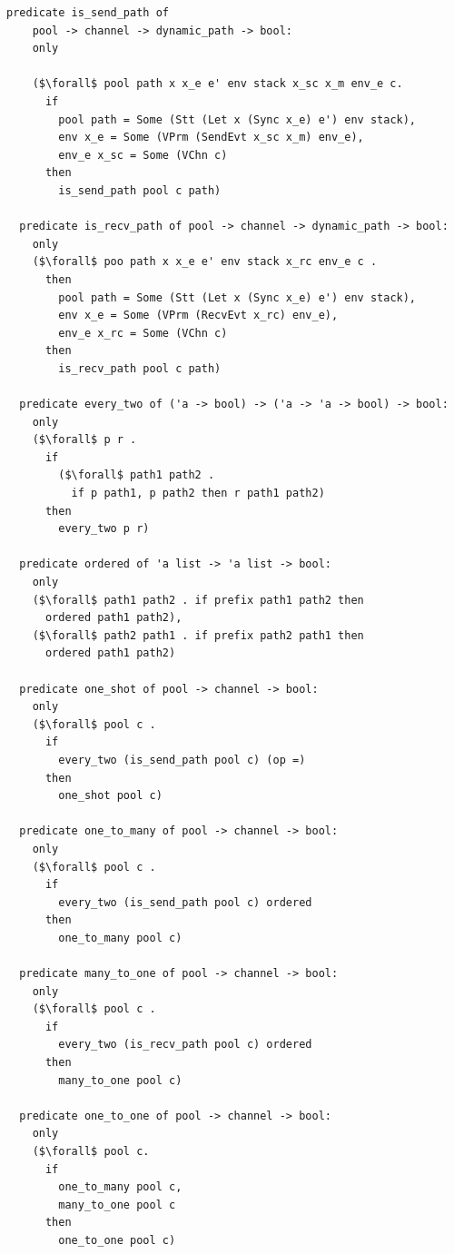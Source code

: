 \documentclass{article}
\begin{document}
\begin{lstlisting}[language=logic, mathescape]
  predicate is_send_path of
    pool -> channel -> dynamic_path -> bool:
    only

    ($\forall$ pool path x x_e e' env stack x_sc x_m env_e c.
      if
        pool path = Some (Stt (Let x (Sync x_e) e') env stack),
        env x_e = Some (VPrm (SendEvt x_sc x_m) env_e), 
        env_e x_sc = Some (VChn c)
      then
        is_send_path pool c path)

  predicate is_recv_path of pool -> channel -> dynamic_path -> bool:
    only
    ($\forall$ poo path x x_e e' env stack x_rc env_e c .
      then
        pool path = Some (Stt (Let x (Sync x_e) e') env stack),
        env x_e = Some (VPrm (RecvEvt x_rc) env_e),
        env_e x_rc = Some (VChn c)
      then
        is_recv_path pool c path)

  predicate every_two of ('a -> bool) -> ('a -> 'a -> bool) -> bool:
    only
    ($\forall$ p r .
      if
        ($\forall$ path1 path2 .
          if p path1, p path2 then r path1 path2)
      then
        every_two p r)

  predicate ordered of 'a list -> 'a list -> bool:
    only
    ($\forall$ path1 path2 . if prefix path1 path2 then
      ordered path1 path2),
    ($\forall$ path2 path1 . if prefix path2 path1 then
      ordered path1 path2)

  predicate one_shot of pool -> channel -> bool:
    only
    ($\forall$ pool c .
      if
        every_two (is_send_path pool c) (op =)
      then
        one_shot pool c)

  predicate one_to_many of pool -> channel -> bool:
    only
    ($\forall$ pool c .
      if
        every_two (is_send_path pool c) ordered
      then
        one_to_many pool c)

  predicate many_to_one of pool -> channel -> bool:
    only
    ($\forall$ pool c .
      if
        every_two (is_recv_path pool c) ordered
      then
        many_to_one pool c)

  predicate one_to_one of pool -> channel -> bool:
    only
    ($\forall$ pool c.
      if
        one_to_many pool c,
        many_to_one pool c
      then
        one_to_one pool c)
  \end{lstlisting}
\end{document}
